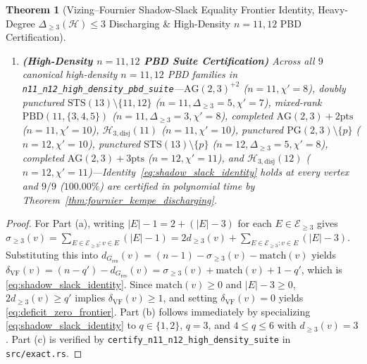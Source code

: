 \documentclass[11pt,reqno]{amsart}
\newtheorem{theorem}{Theorem}[section]
\theoremstyle{definition}
\theoremstyle{remark}
\begin{document}
\begin{theorem}[Vizing--Fournier Shadow-Slack Equality Frontier Identity, Heavy-Degree $\Delta_{\ge 3}(\mathcal{H}) \le 3$ Discharging \& High-Density $n = 11, 12$ PBD Certification]
\begin{enumerate}
  \item[\textup{(c)}] \textbf{(High-Density $n = 11, 12$ PBD Suite Certification)} Across all $9$ canonical high-density $n = 11, 12$ PBD families in \texttt{n11\_n12\_high\_density\_pbd\_suite}---$\mathrm{AG}(2,3)^{+2}$ ($n=11, \chi'=8$), doubly punctured $\mathrm{STS}(13)\setminus\{11,12\}$ ($n=11, \Delta_{\ge 3}=5, \chi'=7$), mixed-rank $\mathrm{PBD}(11,\{3,4,5\})$ ($n=11, \Delta_{\ge 3}=3, \chi'=8$), completed $\mathrm{AG}(2,3)+2\text{pts}$ ($n=11, \chi'=10$), $\mathcal{H}_{3,\mathrm{disj}}(11)$ ($n=11, \chi'=10$), punctured $\mathrm{PG}(2,3)\setminus\{p\}$ ($n=12, \chi'=10$), punctured $\mathrm{STS}(13)\setminus\{p\}$ ($n=12, \Delta_{\ge 3}=5, \chi'=8$), completed $\mathrm{AG}(2,3)+3\text{pts}$ ($n=12, \chi'=11$), and $\mathcal{H}_{3,\mathrm{disj}}(12)$ ($n=12, \chi'=11$)---Identity~\eqref{eq:shadow_slack_identity} holds at every vertex and $9 / 9$ ($100.00\%$) are certified in polynomial time by Theorem~\ref{thm:fournier_kempe_discharging}.
\end{enumerate}
\end{theorem}

\begin{proof}
For Part (a), writing $|E| - 1 = 2 + (|E| - 3)$ for each $E \in \mathcal{E}_{\ge 3}$ gives $\sigma_{\ge 3}(v) = \sum_{E \in \mathcal{E}_{\ge 3} : v \in E}(|E| - 1) = 2 d_{\ge 3}(v) + \sum_{E \in \mathcal{E}_{\ge 3} : v \in E}(|E| - 3)$. Substituting this into $d_{G_{\mathrm{res}}}(v) = (n - 1) - \sigma_{\ge 3}(v) - \mathrm{match}(v)$ yields $\delta_{\mathrm{VF}}(v) = (n - q') - d_{G_{\mathrm{res}}}(v) = \sigma_{\ge 3}(v) + \mathrm{match}(v) + 1 - q'$, which is \eqref{eq:shadow_slack_identity}. Since $\mathrm{match}(v) \ge 0$ and $|E| - 3 \ge 0$, $2 d_{\ge 3}(v) \ge q'$ implies $\delta_{\mathrm{VF}}(v) \ge 1$, and setting $\delta_{\mathrm{VF}}(v) = 0$ yields \eqref{eq:deficit_zero_frontier}. Part (b) follows immediately by specializing \eqref{eq:shadow_slack_identity} to $q \in \{1, 2\}$, $q = 3$, and $4 \le q \le 6$ with $d_{\ge 3}(v) = 3$. Part (c) is verified by \texttt{certify\_n11\_n12\_high\_density\_suite} in \texttt{src/exact.rs}.
\end{proof}
\end{document}
